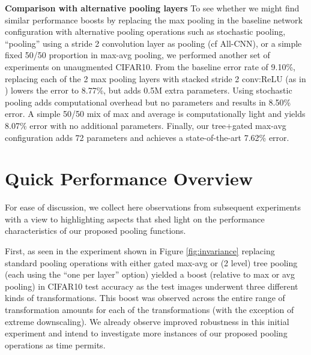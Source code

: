 \documentclass[twoside]{article}
\begin{document}
\textbf{Comparison with alternative pooling layers}
To see whether we might find similar performance boosts by replacing the max pooling
in the baseline network configuration with alternative pooling operations such as 
stochastic pooling, ``pooling'' using a stride 2 convolution layer as pooling (cf 
All-CNN), or a simple fixed 50/50 proportion in max-avg pooling, we performed another 
set of experiments on unaugmented CIFAR10. From the baseline error rate of 9.10\%, 
replacing each of the 2 max pooling layers with stacked stride 2 conv:ReLU (as in \cite{springenberg2015striving})
lowers the error to 8.77\%, but adds 0.5M extra parameters. Using stochastic pooling \cite{zeiler2013stochastic} 
adds computational overhead but no parameters and results in 8.50\% error. A simple
50/50 mix of max and average is computationally light and yields 8.07\% error with no
additional parameters. Finally, our tree+gated max-avg configuration adds 72 parameters
and achieves a state-of-the-art 7.62\% error.
\vspace{-2mm}
\section{Quick Performance Overview}
\vspace{-4mm}
For ease of discussion, we collect here observations from subsequent experiments 
with a view to highlighting aspects that shed light on the performance characteristics
of our proposed pooling functions. 

\vspace{-.5mm}
First, as seen in the experiment shown in Figure \ref{fig:invariance} replacing 
standard pooling operations with either gated max-avg or (2 level) tree pooling 
(each using the ``one per layer'' option) yielded a boost (relative to max or avg pooling) 
in CIFAR10 test accuracy as the test images underwent three different kinds of transformations. 
This boost was observed across the entire range of transformation amounts for each 
of the transformations (with the exception of extreme downscaling). We already observe improved 
robustness in this initial experiment and intend to investigate more instances 
of our proposed pooling operations as time permits.
\end{document}
